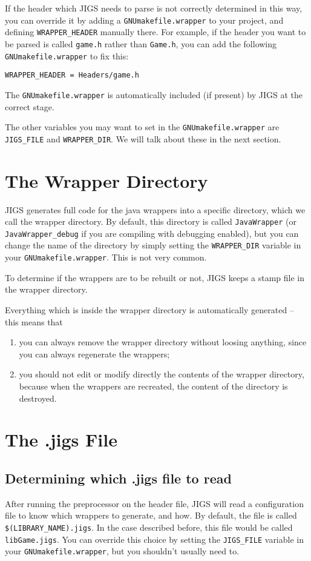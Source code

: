 If the header which JIGS needs to parse is not correctly determined in
this way, you can override it by adding a \texttt{GNUmakefile.wrapper}
to your project, and defining \texttt{WRAPPER\_HEADER} manually there.
For example, if the header you want to be parsed is called
\texttt{game.h} rather than \texttt{Game.h}, you can add the following 
\texttt{GNUmakefile.wrapper} to fix this: 
\begin{verbatim}
WRAPPER_HEADER = Headers/game.h
\end{verbatim}
The \texttt{GNUmakefile.wrapper} is automatically included (if present) 
by JIGS at the correct stage.

The other variables you may want to set in the
\texttt{GNUmakefile.wrapper} are \texttt{JIGS\_FILE} and
\texttt{WRAPPER\_DIR}.  We will talk about these in the next section.

\section{The Wrapper Directory}
JIGS generates full code for the java wrappers into a specific
directory, which we call the wrapper directory.  By default, this
directory is called \texttt{JavaWrapper} (or
\texttt{JavaWrapper\_debug} if you are compiling with debugging
enabled), but you can change the name of the directory by simply
setting the \texttt{WRAPPER\_DIR} variable in your
\texttt{GNUmakefile.wrapper}.  This is not very common.

To determine if the wrappers are to be rebuilt or not, JIGS keeps a
stamp file in the wrapper directory.

Everything which is inside the wrapper directory is automatically
generated -- this means that
\begin{enumerate}
\item you can always remove the wrapper directory without loosing anything, 
since you can always regenerate the wrappers;
\item you should not edit or modify directly the contents of the wrapper 
directory, because when the wrappers are recreated, the content of the 
directory is destroyed.
\end{enumerate}

\section{The .jigs File}

\subsection{Determining which .jigs file to read}
After running the preprocessor on the header file, JIGS will read a
configuration file to know which wrappers to generate, and how.  By
default, the file is called \texttt{\$(LIBRARY\_NAME).jigs}.  In the
case described before, this file would be called
\texttt{libGame.jigs}.  You can override this choice by setting the
\texttt{JIGS\_FILE} variable in your \texttt{GNUmakefile.wrapper}, 
but you shouldn't usually need to.

